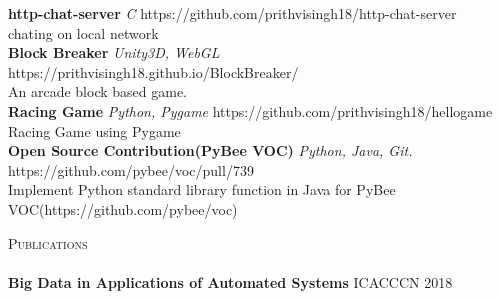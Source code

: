 \documentclass[a4paper]{article}
\newcommand{\lineunder} {
    \vspace*{-8pt} \\
    \hspace*{-18pt} \hrulefill \\
}
\newcommand{\header} [1] {
    {\hspace*{-18pt}\vspace*{6pt} \textsc{#1}}
    \vspace*{-6pt} \lineunder
}
\begin{document}
\vspace*{2mm}
{\textbf{http-chat-server}} {\sl C} \hfill https://github.com/prithvisingh18/http-chat-server\\
chating on local network\\
\vspace*{2mm}
{\textbf{Block Breaker}} {\sl Unity3D, WebGL} \hfill https://prithvisingh18.github.io/BlockBreaker/\\
An arcade block based game.\\
\vspace*{2mm}
{\textbf{Racing Game}} {\sl Python, Pygame} \hfill https://github.com/prithvisingh18/hellogame\\
Racing Game using Pygame\\
\vspace*{2mm}
{\textbf{Open Source Contribution(PyBee VOC)}} {\sl Python, Java, Git.} \hfill https://github.com/pybee/voc/pull/739\\
Implement Python standard library function in Java for PyBee VOC(https://github.com/pybee/voc)\\
\vspace*{2mm}

\header{Publications}
\textbf{Big Data in Applications of Automated Systems} \hfill ICACCCN 2018\\

\vspace*{2mm}

\ 
\end{document}
